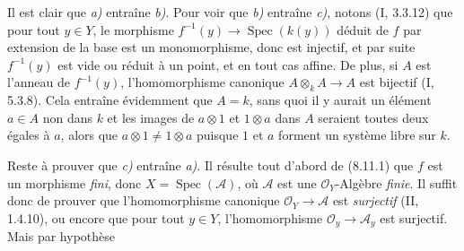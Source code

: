 Il est clair que \emph{a)} entraîne \emph{b)}. Pour voir que \emph{b)}
entraîne \emph{c)}, notons (I, 3.3.12) que pour tout $y\in Y$, le morphisme
$f^{-1}(y)\to\operatorname{Spec}(k(y))$ déduit de $f$ par extension de la base
est un monomorphisme, donc est injectif, et par suite $f^{-1}(y)$ est vide ou
réduit à un point, et en tout cas affine. De plus, si $A$ est l'anneau de
$f^{-1}(y)$, l'homomorphisme canonique $A\otimes_kA\to A$ est bijectif
(I, 5.3.8). Cela entraîne évidemment que $A=k$, sans quoi il y aurait un
élément $a\in A$ non dans $k$ et les images de $a\otimes1$ et $1\otimes a$
dans $A$ seraient toutes deux égales à $a$, alors que $a\otimes1\neq1\otimes a$
puisque $1$ et $a$ forment un système libre sur $k$.

Reste à prouver que \emph{c)} entraîne \emph{a)}. Il résulte tout d'abord de
(8.11.1) que $f$ est un morphisme \emph{fini}, donc
$X=\operatorname{Spec}(\mathcal A)$, où $\mathcal A$ est une
$\mathcal O_Y$-Algèbre \emph{finie}. Il suffit donc de prouver que
l'homomorphisme canonique $\mathcal O_Y\to\mathcal A$ est \emph{surjectif}
(II, 1.4.10), ou encore que pour tout $y\in Y$, l'homomorphisme
$\mathcal O_y\to\mathcal A_y$ est surjectif. Mais par hypothèse
